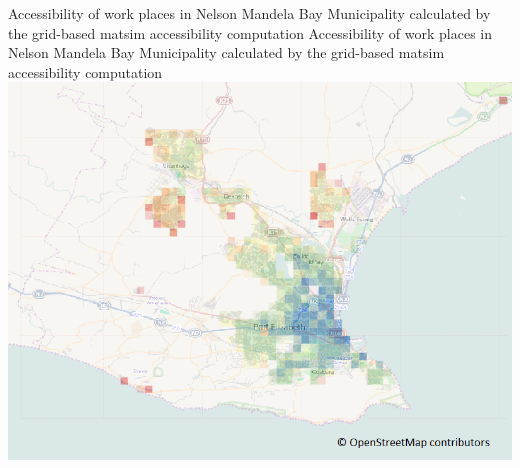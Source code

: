 
%

\createfigure%
{Accessibility of work places in Nelson Mandela Bay Municipality calculated
	by the grid-based \gls{matsim} accessibility computation}%
{Accessibility of work places in Nelson Mandela Bay Municipality calculated
	by the grid-based \gls{matsim} accessibility computation}%
{\label{fig:accessibility-nmbm}}%
{\includegraphics[width=0.99\hsize]{extending/figures/accessibility/w_freeSpeed_snapshot.png}}%
{}

